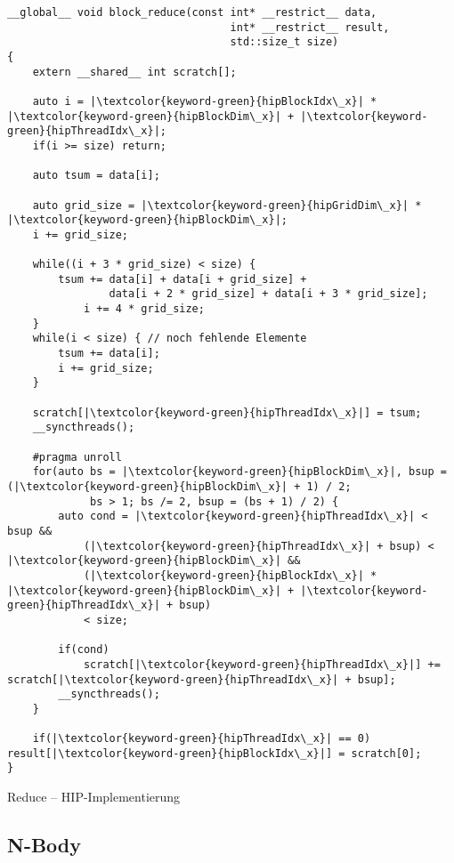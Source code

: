 \begin{code}
    \begin{verbatim}
__global__ void block_reduce(const int* __restrict__ data,
                                   int* __restrict__ result,
                                   std::size_t size)
{
    extern __shared__ int scratch[]; 

    auto i = |\textcolor{keyword-green}{hipBlockIdx\_x}| * |\textcolor{keyword-green}{hipBlockDim\_x}| + |\textcolor{keyword-green}{hipThreadIdx\_x}|;
    if(i >= size) return;

    auto tsum = data[i];

    auto grid_size = |\textcolor{keyword-green}{hipGridDim\_x}| * |\textcolor{keyword-green}{hipBlockDim\_x}|;
    i += grid_size;

    while((i + 3 * grid_size) < size) {
        tsum += data[i] + data[i + grid_size] +
                data[i + 2 * grid_size] + data[i + 3 * grid_size];
            i += 4 * grid_size;
    }
    while(i < size) { // noch fehlende Elemente
        tsum += data[i];
        i += grid_size;
    }

    scratch[|\textcolor{keyword-green}{hipThreadIdx\_x}|] = tsum;
    __syncthreads();

    #pragma unroll
    for(auto bs = |\textcolor{keyword-green}{hipBlockDim\_x}|, bsup = (|\textcolor{keyword-green}{hipBlockDim\_x}| + 1) / 2;
             bs > 1; bs /= 2, bsup = (bs + 1) / 2) {
        auto cond = |\textcolor{keyword-green}{hipThreadIdx\_x}| < bsup &&
            (|\textcolor{keyword-green}{hipThreadIdx\_x}| + bsup) < |\textcolor{keyword-green}{hipBlockDim\_x}| &&
            (|\textcolor{keyword-green}{hipBlockIdx\_x}| * |\textcolor{keyword-green}{hipBlockDim\_x}| + |\textcolor{keyword-green}{hipThreadIdx\_x}| + bsup)
            < size;

        if(cond)
            scratch[|\textcolor{keyword-green}{hipThreadIdx\_x}|] += scratch[|\textcolor{keyword-green}{hipThreadIdx\_x}| + bsup];
        __syncthreads();
    }

    if(|\textcolor{keyword-green}{hipThreadIdx\_x}| == 0) result[|\textcolor{keyword-green}{hipBlockIdx\_x}|] = scratch[0];
}
    \end{verbatim}
    \caption{Reduce -- HIP-Implementierung}
    \label{anhang:hip:reduction}
\end{code}

\subsection{N-Body}

